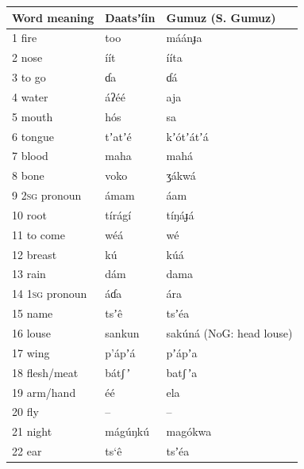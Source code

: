 \documentclass[output=paper]{langsci/langscibook}
\begin{document}
\begin{longtable}{p{}  p{} p{}}
\lsptoprule
Word meaning & Daatsʼíin & Gumuz (S. Gumuz)\\
\midrule
1 fire & too & máánɟa \\

2 nose & íít & ííta \\

3 to go & ɗa & ɗá \\

4 water & áʔéé & aja \\

5 mouth & h\'{o}s & sa \\

6 tongue & tʼatʼé & kʼ\'{o}tʼátʼá \\

7 blood & maha & mahá \\

8 bone & voko & ʒákwá \\

9 2\textsc{sg} pronoun & ámam & áam \\

10 root & tírágí & tíŋáɟá \\

11 to come & wéá & wé \\

12 breast & k\'{u} & k\'{u}á \\

13 rain & dám & dama \\

14 1\textsc{sg} pronoun & áɗa & ára \\

15 name & tsʼ\^{e} & tsʼéa \\

16 louse & sankun & sak\'{u}ná (NoG: head louse) \\

17 wing & p’ápʼá & pʼápʼa \\

18 flesh/meat & bátʃ\,ʼ & batʃ\,ʼa \\

19 arm/hand & éé & ela \\

20 fly & -- & -- \\

21 night & mág\'{u}ŋk\'{u} & mag\'{o}kwa \\

22 ear & ts‘\^{e} & tsʼéa \\


\end{longtable}
\end{document}
